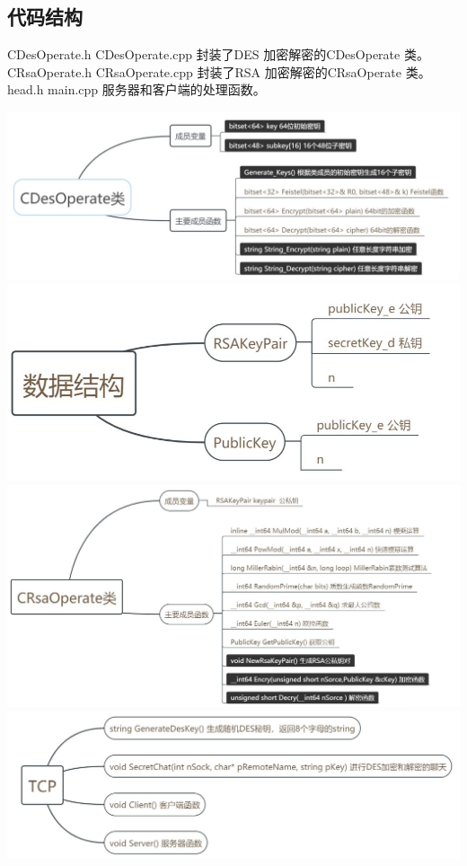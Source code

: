 \documentclass[UTF8,a4paper,10pt]{ctexart}
\begin{document}
\subsection{代码结构}
\noindent CDesOperate.h CDesOperate.cpp 封装了DES 加密解密的CDesOperate 类。\\
CRsaOperate.h CRsaOperate.cpp 封装了RSA 加密解密的CRsaOperate 类。\\
head.h main.cpp 服务器和客户端的处理函数。\\
\begin{center}
  \includegraphics*[]{1.jpg}
  \includegraphics*[]{2.jpg}
  \includegraphics*[]{3.jpg}
  \includegraphics*[]{4.jpg}
\end{center}
\end{document}
